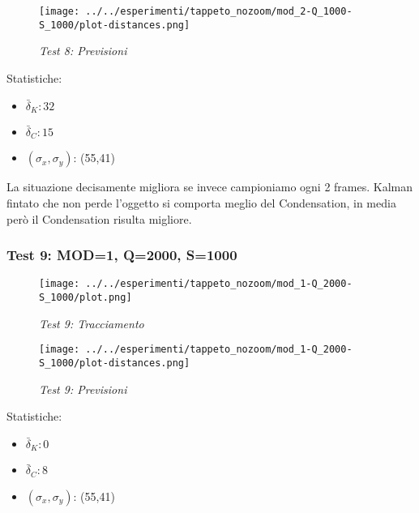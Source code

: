 \begin{figure}[hb]
\centering
\texttt{[image: ../../esperimenti/tappeto\_nozoom/mod\_2-Q\_1000-S\_1000/plot-distances.png]}
\caption{\textit{Test 8: Previsioni}}
\end{figure}

Statistiche:
\begin{itemize}
\item \begin{math} \bar \delta_K: 32 \end{math}
\item \begin{math} \bar \delta_C: 15 \end{math}
\item \begin{math}(\sigma_x,\sigma_y)\end{math}: (55,41)
\end{itemize}

La situazione decisamente migliora se invece campioniamo ogni 2 frames. Kalman fintato che non perde l'oggetto si comporta meglio del Condensation, in media però il Condensation risulta migliore.


\newpage
\subsubsection{Test 9: MOD=1, Q=2000, S=1000}

\begin{figure}[hb]
\centering
\texttt{[image: ../../esperimenti/tappeto\_nozoom/mod\_1-Q\_2000-S\_1000/plot.png]}
\caption{\textit{Test 9: Tracciamento}}
\end{figure}

\begin{figure}[hb]
\centering
\texttt{[image: ../../esperimenti/tappeto\_nozoom/mod\_1-Q\_2000-S\_1000/plot-distances.png]}
\caption{\textit{Test 9: Previsioni}}
\end{figure}

Statistiche:
\begin{itemize}
\item \begin{math} \bar \delta_K: 0 \end{math}
\item \begin{math} \bar \delta_C: 8 \end{math}
\item \begin{math}(\sigma_x,\sigma_y)\end{math}: (55,41)
\end{itemize}

